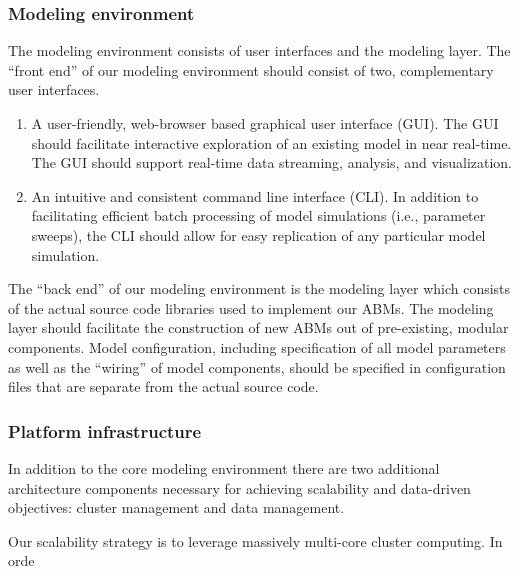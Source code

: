 \documentclass[11pt]{amsart}
\begin{document}
\subsubsection{Modeling environment}
The modeling environment consists of user interfaces and the modeling layer. The ``front end'' of our modeling environment should consist of two, complementary user interfaces.
\begin{enumerate}
    \item A user-friendly, web-browser based graphical user interface (GUI). The GUI should facilitate interactive exploration of an existing model in near real-time.  The GUI should support real-time data streaming, analysis, and visualization.
    \item An intuitive and consistent command line interface (CLI). In addition to facilitating efficient batch processing of model simulations (i.e., parameter sweeps), the CLI should allow for easy replication of any particular model simulation.
\end{enumerate}
The ``back end'' of our modeling environment is the modeling layer which consists of the actual source code libraries used to implement our ABMs. The modeling layer should facilitate the construction of new ABMs out of pre-existing, modular components.  Model configuration, including specification of all model parameters as well as the ``wiring'' of model components, should be specified in configuration files that are separate from the actual source code. 

\subsubsection{Platform infrastructure}
In addition to the core modeling environment there are two additional architecture components necessary for achieving scalability and data-driven objectives: cluster management and data management.

Our scalability strategy is to leverage massively multi-core cluster computing. In orde
\end{document}
